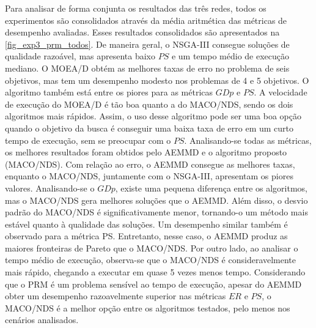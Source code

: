 Para analisar de forma conjunta os resultados das três redes, todos os experimentos são consolidados através da média aritmética das métricas de desempenho avaliadas. Esses resultados consolidados são apresentados na \autoref{fig_exp3_prm_todos}. De maneira geral, o NSGA-III consegue soluções de qualidade razoável, mas apresenta baixo $PS$ e um tempo médio de execução mediano. O MOEA/D obtém as melhores taxas de erro no problema de seis objetivos, mas tem um desempenho modesto nos problemas de 4 e 5 objetivos. O algoritmo também está entre os piores para as métricas $GDp$ e $PS$. A velocidade de execução do MOEA/D é tão boa quanto a do MACO/NDS, sendo os dois algoritmos mais rápidos. Assim, o uso desse algoritmo pode ser uma boa opção quando o objetivo da busca é conseguir uma baixa taxa de erro em um curto tempo de execução, sem se preocupar com o $PS$. Analisando-se todas as métricas, os melhores resultados foram obtidos pelo AEMMD e o algoritmo proposto (MACO/NDS). Com relação ao erro, o AEMMD consegue as melhores taxas, enquanto o MACO/NDS, juntamente com o NSGA-III, apresentam os piores valores. Analisando-se o $GDp$, existe uma pequena diferença entre os algoritmos, mas o MACO/NDS gera melhores soluções que o AEMMD. Além disso, o desvio padrão do MACO/NDS é significativamente menor, tornando-o um método mais estável quanto à qualidade das soluções. Um desempenho similar também é observado para a métrica PS. Entretanto, nesse caso, o AEMMD produz as maiores fronteiras de Pareto que o MACO/NDS. Por outro lado, ao analisar o tempo médio de execução, observa-se que o MACO/NDS é consideravelmente mais rápido, chegando a executar em quase 5 vezes menos tempo. Considerando que o PRM é um problema sensível ao tempo de execução, apesar do AEMMD obter um desempenho razoavelmente superior nas métricas $ER$ e $PS$, o MACO/NDS é a melhor opção entre os algoritmos testados, pelo menos nos cenários analisados.

